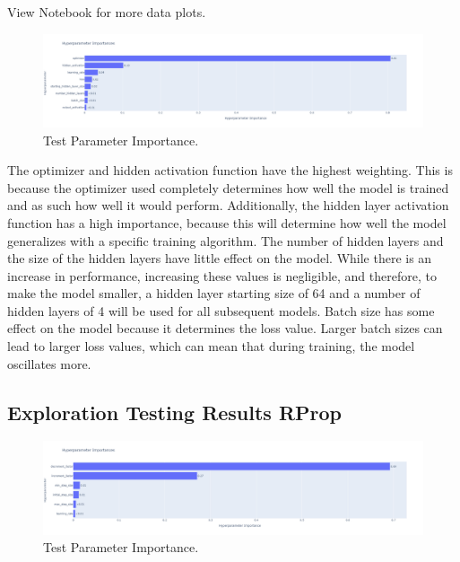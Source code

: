 \documentclass[conference]{IEEEtran}
\begin{document}
View Notebook for more data plots.
\cite{b2} 

\newpage

\begin{figure}[htbp]
\centerline{\includegraphics[width=\columnwidth]{Ex Gen Hyp Opt Res Imp.png}}
\caption{Test Parameter Importance.}
\label{fig}
\end{figure}

The optimizer and hidden activation function have the highest weighting. This is because the optimizer used completely determines how well the model is trained and as such how well it would perform. Additionally, the hidden layer activation function has a high importance, because this will determine how well the model generalizes with a specific training algorithm.
The number of hidden layers and the size of the hidden layers have little effect on the model. While there is an increase in performance, increasing these values is negligible, and therefore, to make the model smaller, a hidden layer starting size of 64 and a number of hidden layers of 4 will be used for all subsequent models. 
Batch size has some effect on the model because it determines the loss value. Larger batch sizes can lead to larger loss values, which can mean that during training, the model oscillates more.

\subsection{Exploration Testing Results RProp}

\begin{figure}[htbp]
\centerline{\includegraphics[width=\columnwidth]{Ex RProp Hyp Opt Res Imp.png}}
\caption{Test Parameter Importance.}
\label{fig}
\end{figure}
\end{document}
